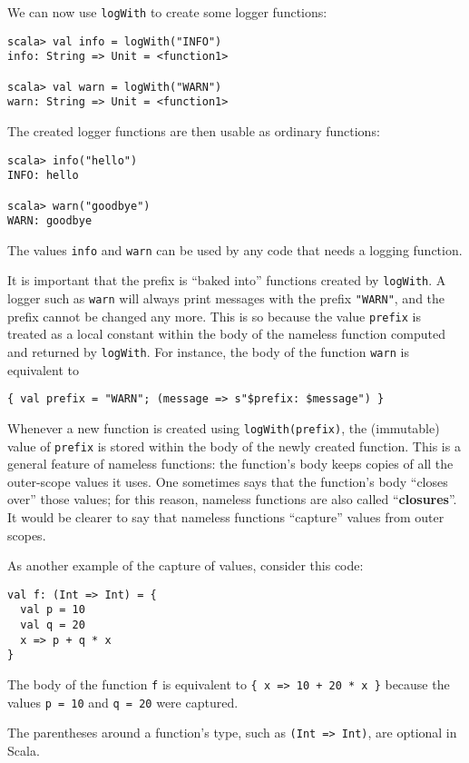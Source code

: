 We can now use \lstinline!logWith! to create some logger functions:
\begin{lstlisting}
scala> val info = logWith("INFO")
info: String => Unit = <function1>

scala> val warn = logWith("WARN")
warn: String => Unit = <function1>
\end{lstlisting}
The created logger functions are then usable as ordinary functions:
\begin{lstlisting}
scala> info("hello")
INFO: hello

scala> warn("goodbye")
WARN: goodbye
\end{lstlisting}
The values \lstinline!info! and \lstinline!warn! can be used by
any code that needs a logging function.

It is important that the prefix is ``baked into'' functions created
by \lstinline!logWith!. A logger such as \lstinline!warn! will always
print messages with the prefix \lstinline!"WARN"!, and the prefix
cannot be changed any more. This is so because the value \lstinline!prefix!
is treated as a local constant within the body of the nameless function
computed and returned by \lstinline!logWith!. For instance, the body
of the function \lstinline!warn! is equivalent to
\begin{lstlisting}
{ val prefix = "WARN"; (message => s"$prefix: $message") }
\end{lstlisting}
Whenever a new function is created using \lstinline!logWith(prefix)!,
the (immutable) value of \lstinline!prefix! is stored within the
body of the newly created function. This is a general feature of nameless
functions: the function's body keeps copies of all the outer-scope
values it uses. One sometimes says that the function's body ``closes
over'' those values; for this reason, nameless functions are also
called ``\textbf{closures}''. It would be clearer
to say that nameless functions ``capture'' values from outer scopes.

As another example of the capture of values, consider this code:
\begin{lstlisting}
val f: (Int => Int) = {
  val p = 10
  val q = 20
  x => p + q * x
}
\end{lstlisting}
The body of the function \lstinline!f! is equivalent to \lstinline!{ x => 10 + 20 * x }!
because the values \lstinline!p = 10! and \lstinline!q = 20! were
captured.

The parentheses around a function's type, such as \lstinline!(Int => Int)!,
are optional in Scala. 

